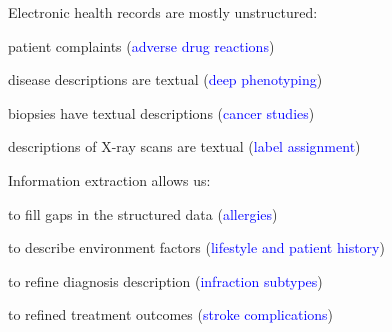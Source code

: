 \documentclass[landscape,footrule]{foils}
\begin{document}
\titlefoil


Electronic health records are mostly unstructured:
\begin{diamonds}
 \item patient complaints (\textcolor{blue}{adverse drug reactions})
 \item disease descriptions are textual (\textcolor{blue}{deep phenotyping})
 \item biopsies have textual descriptions (\textcolor{blue}{cancer studies})
 \item descriptions of X-ray scans are textual (\textcolor{blue}{label assignment})\vspace*{3ex}
\end{diamonds}\vspace{1cm}

Information extraction allows us: 
\begin{diamonds}
\item to fill gaps in the structured data (\textcolor{blue}{allergies})
\item to describe environment factors (\textcolor{blue}{lifestyle and patient history})
\item to refine diagnosis description (\textcolor{blue}{infraction subtypes}) 
\item to refined treatment outcomes (\textcolor{blue}{stroke complications}) 
\end{diamonds}


\end{document}
